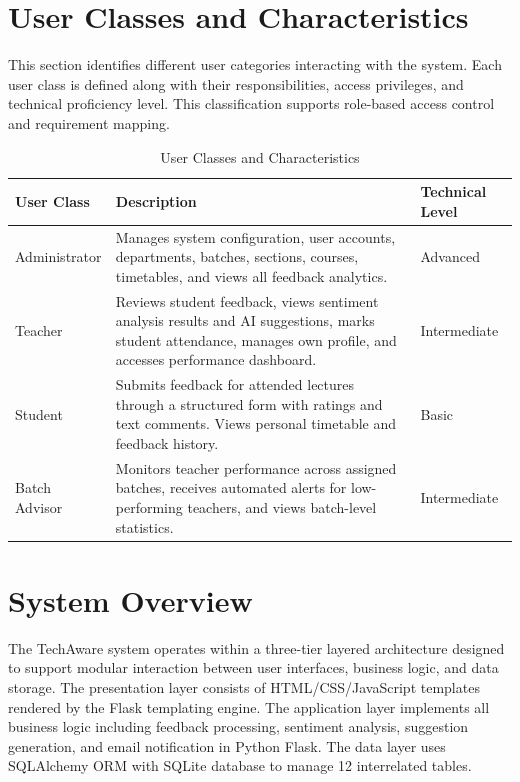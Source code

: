 \section{User Classes and Characteristics}

This section identifies different user categories interacting with the system. Each user class is defined along with their responsibilities, access privileges, and technical proficiency level. This classification supports role-based access control and requirement mapping.

\begin{table}[H]
\centering
\caption{User Classes and Characteristics}

\begin{tabularx}{\textwidth}{|p{3cm}|X|p{3cm}|}
\hline
\textbf{User Class} & \textbf{Description} & \textbf{Technical Level} \\
\hline
Administrator & Manages system configuration, user accounts, departments, batches, sections, courses, timetables, and views all feedback analytics. & Advanced \\
\hline
Teacher & Reviews student feedback, views sentiment analysis results and AI suggestions, marks student attendance, manages own profile, and accesses performance dashboard. & Intermediate \\
\hline
Student & Submits feedback for attended lectures through a structured form with ratings and text comments. Views personal timetable and feedback history. & Basic \\
\hline
Batch Advisor & Monitors teacher performance across assigned batches, receives automated alerts for low-performing teachers, and views batch-level statistics. & Intermediate \\
\hline
\end{tabularx}

\end{table}


\section{System Overview}

The TechAware system operates within a three-tier layered architecture designed to support modular interaction between user interfaces, business logic, and data storage. The presentation layer consists of HTML/CSS/JavaScript templates rendered by the Flask templating engine. The application layer implements all business logic including feedback processing, sentiment analysis, suggestion generation, and email notification in Python Flask. The data layer uses SQLAlchemy ORM with SQLite database to manage 12 interrelated tables.

